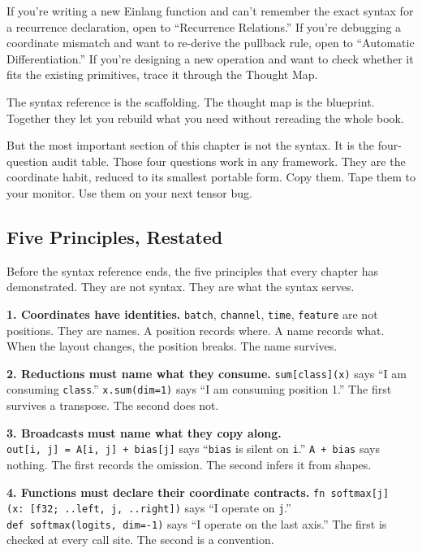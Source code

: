 \documentclass[11pt,titlepage]{article}
\begin{document}
If you're writing a new Einlang function and can't remember the exact
syntax for a recurrence declaration, open to ``Recurrence Relations.''
If you're debugging a coordinate mismatch and want to re-derive the
pullback rule, open to ``Automatic Differentiation.'' If you're
designing a new operation and want to check whether it fits the existing
primitives, trace it through the Thought Map.

The syntax reference is the scaffolding. The thought map is the
blueprint. Together they let you rebuild what you need without rereading
the whole book.

But the most important section of this chapter is not the syntax. It is
the four-question audit table. Those four questions work in any
framework. They are the coordinate habit, reduced to its smallest
portable form. Copy them. Tape them to your monitor. Use them on your
next tensor bug.

\vspace{2em}

\hypertarget{five-principles-restated}{%
\subsection{Five Principles, Restated}\label{five-principles-restated}}

Before the syntax reference ends, the five principles that every chapter
has demonstrated. They are not syntax. They are what the syntax serves.

\textbf{1. Coordinates have identities.} \texttt{batch},
\texttt{channel}, \texttt{time}, \texttt{feature} are not positions.
They are names. A position records where. A name records what. When the
layout changes, the position breaks. The name survives.

\textbf{2. Reductions must name what they consume.}
\texttt{sum{[}class{]}(x)} says ``I am consuming \texttt{class}.''
\texttt{x.sum(dim=1)} says ``I am consuming position 1.'' The first
survives a transpose. The second does not.

\textbf{3. Broadcasts must name what they copy along.}
\texttt{out{[}i,\ j{]}\ =\ A{[}i,\ j{]}\ +\ bias{[}j{]}} says
``\texttt{bias} is silent on \texttt{i}.'' \texttt{A\ +\ bias} says
nothing. The first records the omission. The second infers it from
shapes.

\textbf{4. Functions must declare their coordinate contracts.}
\texttt{fn\ softmax{[}j{]}(x:\ {[}f32;\ ..left,\ j,\ ..right{]})} says
``I operate on \texttt{j}.'' \texttt{def\ softmax(logits,\ dim=-1)} says
``I operate on the last axis.'' The first is checked at every call site.
The second is a convention.
\end{document}
